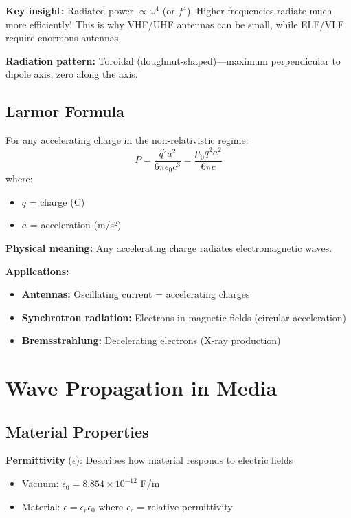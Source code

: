 \begin{keyconcept}
\textbf{Key insight:} Radiated power $\propto \omega^4$ (or $f^4$). Higher frequencies radiate much more efficiently! This is why VHF/UHF antennas can be small, while ELF/VLF require enormous antennas.
\end{keyconcept}

\textbf{Radiation pattern:} Toroidal (doughnut-shaped)---maximum perpendicular to dipole axis, zero along the axis.

\subsection{Larmor Formula}

For any accelerating charge in the non-relativistic regime:
\begin{equation}
P = \frac{q^2 a^2}{6\pi\epsilon_0 c^3} = \frac{\mu_0 q^2 a^2}{6\pi c}
\label{eq:larmor}
\end{equation}
where:
\begin{itemize}
\item $q$ = charge (C)
\item $a$ = acceleration (m/s²)
\end{itemize}

\textbf{Physical meaning:} Any accelerating charge radiates electromagnetic waves.

\textbf{Applications:}
\begin{itemize}
\item \textbf{Antennas:} Oscillating current = accelerating charges
\item \textbf{Synchrotron radiation:} Electrons in magnetic fields (circular acceleration)
\item \textbf{Bremsstrahlung:} Decelerating electrons (X-ray production)
\end{itemize}

\section{Wave Propagation in Media}

\subsection{Material Properties}

\textbf{Permittivity} ($\epsilon$): Describes how material responds to electric fields
\begin{itemize}
\item Vacuum: $\epsilon_0 = 8.854 \times 10^{-12}$ F/m
\item Material: $\epsilon = \epsilon_r \epsilon_0$ where $\epsilon_r$ = relative permittivity
\end{itemize}

